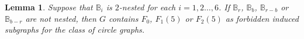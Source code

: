 \documentclass[12pt]{book}
\theoremstyle{plain}
\newtheorem{lema}[teo]{Lemma}
\theoremstyle{remark}
\begin{document}


\begin{lema} \label{lema:matrices_union_son_nested_4tent} %
	Suppose that $\mathbb B_i$ is $2$-nested for each $i =1,2 \ldots, 6$. If $\mathbb B_r$, $\mathbb B_b$, $\mathbb B_{r-b}$ or $\mathbb B_{b-r}$ are not nested, then $G$ contains $F_0$, $F_1(5)$ or $F_2(5)$ as forbidden induced subgraphs for the class of circle graphs.
\end{lema}
\end{document}
